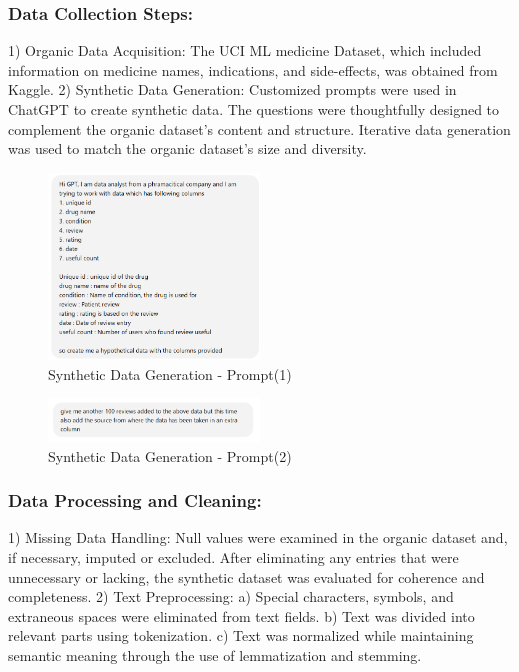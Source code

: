 \documentclass[sigplan,screen]{acmart}
\begin{document}
\subsubsection{Data Collection Steps:}
1) Organic Data Acquisition: The UCI ML medicine Dataset, which included information on medicine names, indications, and side-effects, was obtained from Kaggle.
2) Synthetic Data Generation: Customized prompts were used in ChatGPT to create synthetic data. The questions were thoughtfully designed to complement the organic dataset's content and structure. Iterative data generation was used to match the organic dataset's size and diversity.
\begin{figure}[htbp]
    \centering
    \includegraphics[width=0.5\textwidth]{Prompt - Synthetic Data Generation.png}  %
    \caption{Synthetic Data Generation - Prompt(1)}
    \label{fig:your_label}
\end{figure}
\begin{figure}[htbp]
    \centering
    \includegraphics[width=0.5\textwidth]{Prompt - Synthetic Data Generation (2).png}  %
    \caption{Synthetic Data Generation - Prompt(2)}
    \label{fig:your_label}
\end{figure}
\subsubsection{Data Processing and Cleaning:}
1) Missing Data Handling:
Null values were examined in the organic dataset and, if necessary, imputed or excluded. After eliminating any entries that were unnecessary or lacking, the synthetic dataset was evaluated for coherence and completeness.
2) Text Preprocessing:
a) Special characters, symbols, and extraneous spaces were eliminated from text fields.
b) Text was divided into relevant parts using tokenization.
c) Text was normalized while maintaining semantic meaning through the use of lemmatization and stemming.
\end{document}
